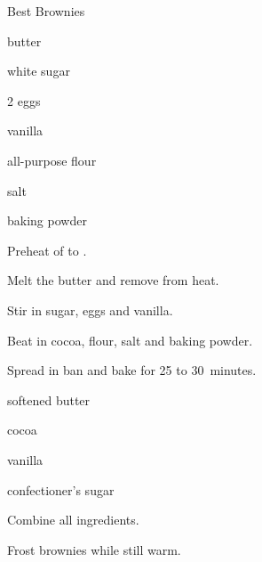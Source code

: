 \begin{recipe}{Best Brownies}{}{}

\begin{ingredients}
\item \C{\half} butter
\item {} white sugar
\item 2 eggs
\item {} vanilla
\item \C{\third} 
\item \C{\half} all-purpose flour
\item \tp{\quarter} salt
\item \tp{\quarter} baking powder
\end{ingredients}

\begin{directions}
\item Preheat of to .
\item Melt the butter and remove from heat.
\item Stir in sugar, eggs and vanilla.
\item Beat in cocoa, flour, salt and baking powder.
\item Spread in ban and bake for 25 to 30~minutes. 
\end{directions}


\begin{ingredients}
\item {} softened butter
\item {} cocoa
\item {} 
\item {} vanilla
\item {} confectioner's sugar
\end{ingredients}

\begin{directions}
\item Combine all ingredients.
\item Frost brownies while still warm.
\end{directions}
\end{recipe}

